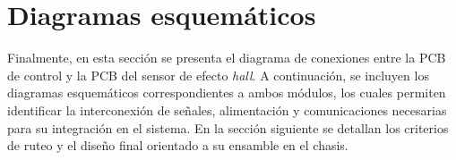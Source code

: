 \section{Diagramas esquemáticos}
Finalmente, en esta sección se presenta el diagrama de conexiones entre la \ac{PCB} de control y la \ac{PCB} del sensor de efecto \textit{hall}. A continuación, se incluyen los diagramas esquemáticos correspondientes a ambos módulos, los cuales permiten identificar la interconexión de señales, alimentación y comunicaciones necesarias para su integración en el sistema. En la sección siguiente se detallan los criterios de ruteo y el diseño final orientado a su ensamble en el chasis.
\begin{landscape}
\label{plano base}

\end{landscape}

\begin{landscape}
\label{plano base}

\end{landscape}